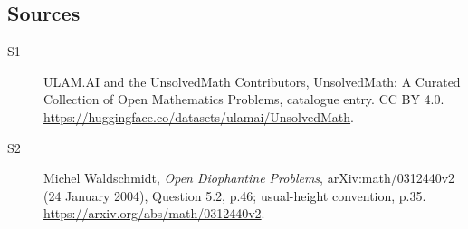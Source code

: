 \documentclass[11pt]{article}
\begin{document}
\subsection{Sources}
\begin{description}
\item[\hypertarget{source:statement:1}{S1}] ULAM.AI and the UnsolvedMath Contributors, UnsolvedMath: A Curated Collection of Open Mathematics Problems, catalogue entry. CC BY 4.0. \url{https://huggingface.co/datasets/ulamai/UnsolvedMath}.
\item[\hypertarget{source:statement:2}{S2}] Michel Waldschmidt, \emph{Open Diophantine Problems}, arXiv:math/0312440v2 (24 January 2004), Question 5.2, p.46; usual-height convention, p.35. \url{https://arxiv.org/abs/math/0312440v2}.
\end{description}
\label{end:statement}
\end{document}

